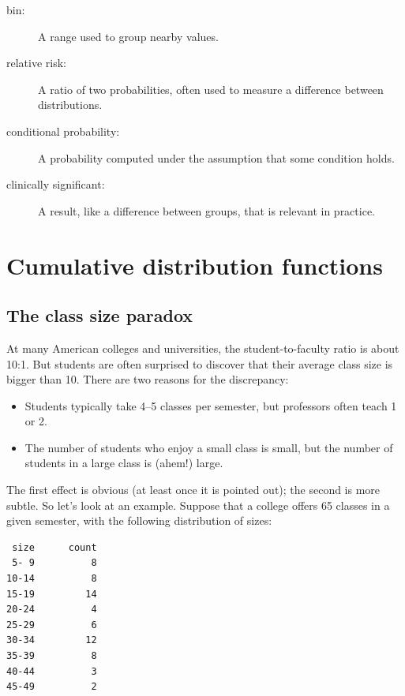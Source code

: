\documentclass[12pt]{book}
\begin{document}
\begin{description}
\item[bin:] A range used to group nearby values.

\item[relative risk:] A ratio of two probabilities, often used to measure
a difference between distributions.

\item[conditional probability:] A probability computed under the assumption
that some condition holds.

\item[clinically significant:] A result, like a difference between groups,
that is relevant in practice.

\end{description}


\chapter{Cumulative distribution functions}
\label{cumulative}

\section{The class size paradox}

At many American colleges and universities, the student-to-faculty
ratio is about 10:1.  But students are often surprised to discover
that their average class size is bigger than 10.  There
are two reasons for the discrepancy:

\begin{itemize}

\item Students typically take 4--5 classes per semester, but
professors often teach 1 or 2.

\item The number of students who enjoy a small class is small,
but the number of students in a large class is (ahem!) large.

\end{itemize}

The first effect is obvious (at least once it is pointed out);
the second is more subtle.  So let's look at an example.  Suppose
that a college offers 65 classes in a given semester, with the
following distribution of sizes:
%
\begin{verbatim}
 size      count
 5- 9          8
10-14          8
15-19         14
20-24          4
25-29          6
30-34         12
35-39          8
40-44          3
45-49          2
\end{verbatim}
\end{document}
